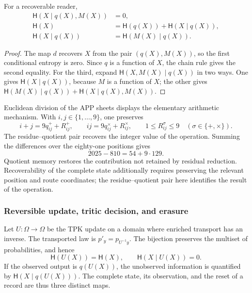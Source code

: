 \begin{proposition}
For a recoverable reader,
\begin{align}
 \mathsf H(X\mid q(X),M(X))&=0,\\
 \mathsf H(X)&=\mathsf H(q(X))+\mathsf H(X\mid q(X)),\\
 \mathsf H(X\mid q(X))&=\mathsf H(M(X)\mid q(X)).
 \label{eq:ii-kb-aut-fibra}
\end{align}
\end{proposition}
\begin{proof}
The map \(d\) recovers \(X\) from the pair \((q(X),M(X))\),
so the first conditional entropy is zero. Since \(q\) is
a function of \(X\), the chain rule gives the second equality.
For the third, expand
\(\mathsf H(X,M(X)\mid q(X))\) in two ways. One gives
\(\mathsf H(X\mid q(X))\), because \(M\) is a function of \(X\);
the other gives
\(\mathsf H(M(X)\mid q(X))+\mathsf H(X\mid q(X),M(X))\).
\end{proof}

Euclidean division of the APP sheets displays the elementary
arithmetic mechanism. With \(i,j\in\{1,\ldots,9\}\), one preserves
\[
 i+j=9q^+_{ij}+R^+_{ij},\qquad
 ij=9q^\times_{ij}+R^\times_{ij},\qquad
 1\leq R^\sigma_{ij}\leq9\quad(\sigma\in\{+,\times\}).
\]
The residue--quotient pair recovers the integer value of the operation.
Summing the differences over the eighty-one positions gives
\[
 2025-810=54+9\cdot129.
\]
Quotient memory restores the contribution not retained by
residual reduction. Recoverability of the complete state additionally
requires preserving the relevant position and route coordinates;
the residue--quotient pair here identifies the result of the operation.

\subsubsection{Reversible update, tritic decision, and erasure}

Let \(U:\Omega\to\Omega\) be the TPK update on a domain where
enriched transport has an inverse. The transported law is
\(p'_y=p_{U^{-1}y}\). The bijection preserves the multiset of
probabilities, and hence
\begin{equation}
 \mathsf H(U(X))=\mathsf H(X),\qquad
 \mathsf H(X\mid U(X))=0.
 \label{eq:ii-kb-aut-reversible}
\end{equation}
If the observed output is \(q(U(X))\), the unobserved information
is quantified by \(\mathsf H(X\mid q(U(X)))\). The complete state,
its observation, and the reset of a record are thus three distinct maps.

